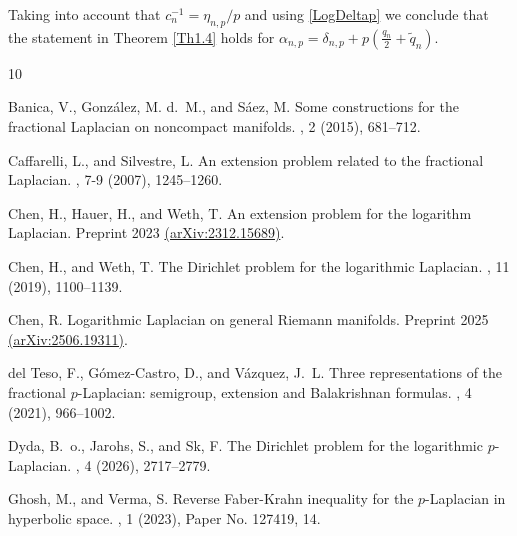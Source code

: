 \documentclass[a4paper,10pt, reqno]{amsart}
\theoremstyle{definition}
\theoremstyle{remark}
\numberwithin{equation}{section}
\begin{document}
{Taking into account that $c_n^{-1}=\eta_{n,p}/p$ and using \eqref{LogDeltap} we conclude that the statement in Theorem \ref{Th1.4} holds for $\alpha_{n,p}=\delta_{n,p}+p(\tfrac{q_n}{2}+\widetilde{q}_n)$.






%

\begin{thebibliography}{10}

{\sc Banica, V., Gonz\'alez, M. d.~M., and S\'aez, M.}
\newblock Some constructions for the fractional {L}aplacian on noncompact
  manifolds.
, 2 (2015), 681--712.

{\sc Caffarelli, L., and Silvestre, L.}
\newblock An extension problem related to the fractional {L}aplacian.
, 7-9 (2007),
  1245--1260.

{\sc Chen, H., Hauer, H., and Weth, T.}
\newblock An extension problem for the logarithm {L}aplacian.
\newblock Preprint 2023
  \href{http://arxiv.org/abs/2312.15689}{(arXiv:2312.15689)}.

{\sc Chen, H., and Weth, T.}
\newblock The {D}irichlet problem for the logarithmic {L}aplacian.
, 11 (2019), 1100--1139.

{\sc Chen, R.}
\newblock Logarithmic {L}aplacian on general {R}iemann manifolds.
\newblock Preprint 2025
  \href{http://arxiv.org/abs/2506.19311}{(arXiv:2506.19311)}.

{\sc del Teso, F., G\'omez-Castro, D., and V\'azquez, J.~L.}
\newblock Three representations of the fractional {$p$}-{L}aplacian: semigroup,
  extension and {B}alakrishnan formulas.
, 4 (2021), 966--1002.

{\sc Dyda, B.~o., Jarohs, S., and Sk, F.}
\newblock The {D}irichlet problem for the logarithmic {$p$}-{L}aplacian.
, 4 (2026), 2717--2779.

{\sc Ghosh, M., and Verma, S.}
\newblock Reverse {F}aber-{K}rahn inequality for the {$p$}-{L}aplacian in
  hyperbolic space.
, 1 (2023), Paper No. 127419, 14.


\end{thebibliography}}
\end{document}
